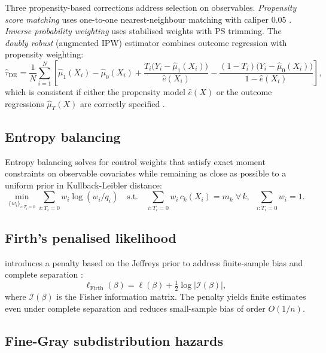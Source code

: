 \documentclass[review,authoryear,11pt]{elsarticle}
\begin{document}
Three propensity-based corrections address selection on observables. \textit{Propensity score matching} uses one-to-one nearest-neighbour matching with caliper $0.05$ \citep{Caliendo2008}. \textit{Inverse probability weighting} \citep{Robins1994} uses stabilised weights with PS trimming. The \textit{doubly robust} (augmented IPW) estimator combines outcome regression with propensity weighting:
\begin{equation}
  \hat\tau_{\mathrm{DR}} = \frac{1}{N}\sum_{i=1}^N \left[\hat\mu_1(X_i) - \hat\mu_0(X_i) + \frac{T_i\bigl(Y_i - \hat\mu_1(X_i)\bigr)}{\hat e(X_i)} - \frac{(1-T_i)\bigl(Y_i - \hat\mu_0(X_i)\bigr)}{1-\hat e(X_i)}\right],
  \label{eq:dr}
\end{equation}
which is consistent if either the propensity model $\hat e(X)$ or the outcome regressions $\hat\mu_T(X)$ are correctly specified \citep{Bang2005}.

\subsection{Entropy balancing}

Entropy balancing \citep{Hainmueller2012} solves for control weights that satisfy exact moment constraints on observable covariates while remaining as close as possible to a uniform prior in Kullback-Leibler distance:
\begin{equation}
  \min_{\{w_i\}_{i:T_i=0}} \sum_{i:T_i=0} w_i \log(w_i/q_i) \quad \text{s.t.} \quad \sum_{i:T_i=0} w_i \, c_{k}(X_i) = m_k \;\forall\, k, \;\; \sum_{i:T_i=0} w_i = 1.
  \label{eq:eb}
\end{equation}

\subsection{Firth's penalised likelihood}

\citet{Firth1993} introduces a penalty based on the Jeffreys prior to address finite-sample bias and complete separation \citep{HeinzeSchemper2002}:
\begin{equation}
  \ell_{\mathrm{Firth}}(\beta) = \ell(\beta) + \tfrac{1}{2}\log\bigl|\mathcal{I}(\beta)\bigr|,
  \label{eq:firth}
\end{equation}
where $\mathcal{I}(\beta)$ is the Fisher information matrix. The penalty yields finite estimates even under complete separation and reduces small-sample bias of order $O(1/n)$.

\subsection{Fine-Gray subdistribution hazards}
\end{document}
